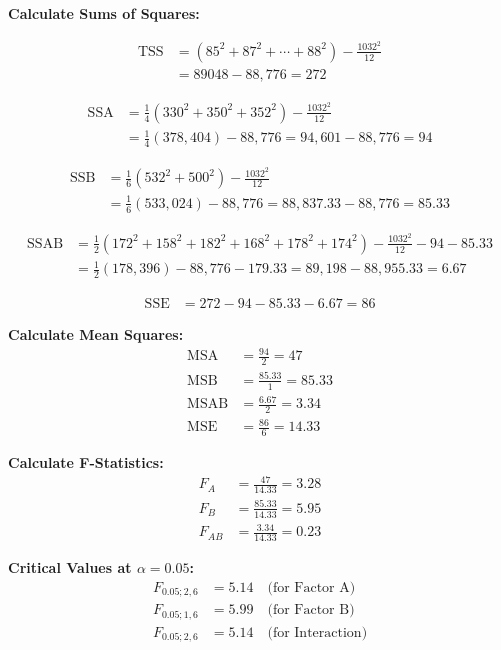 \documentclass[twoside]{book}
\begin{document}
\textbf{Calculate Sums of Squares:}

\begin{align*}
\text{TSS} &= (85^2 + 87^2 + \cdots + 88^2) - \frac{1032^2}{12} \\
&= 89048 - 88,776 = 272
\end{align*}

\begin{align*}
\text{SSA} &= \frac{1}{4}(330^2 + 350^2 + 352^2) - \frac{1032^2}{12} \\
&= \frac{1}{4}(378,404) - 88,776 = 94,601 - 88,776 = 94
\end{align*}

\begin{align*}
\text{SSB} &= \frac{1}{6}(532^2 + 500^2) - \frac{1032^2}{12} \\
&= \frac{1}{6}(533,024) - 88,776 = 88,837.33 - 88,776 = 85.33
\end{align*}

\begin{align*}
\text{SSAB} &= \frac{1}{2}(172^2 + 158^2 + 182^2 + 168^2 + 178^2 + 174^2) - \frac{1032^2}{12} - 94 - 85.33 \\
&= \frac{1}{2}(178,396) - 88,776 - 179.33 = 89,198 - 88,955.33 = 6.67
\end{align*}

\begin{align*}
\text{SSE} &= 272 - 94 - 85.33 - 6.67 = 86
\end{align*}

\textbf{Calculate Mean Squares:}
\begin{align*}
\text{MSA} &= \frac{94}{2} = 47 \\
\text{MSB} &= \frac{85.33}{1} = 85.33 \\
\text{MSAB} &= \frac{6.67}{2} = 3.34 \\
\text{MSE} &= \frac{86}{6} = 14.33
\end{align*}

\textbf{Calculate F-Statistics:}
\begin{align*}
F_A &= \frac{47}{14.33} = 3.28 \\
F_B &= \frac{85.33}{14.33} = 5.95 \\
F_{AB} &= \frac{3.34}{14.33} = 0.23
\end{align*}

\textbf{Critical Values at $\alpha = 0.05$:}
\begin{align*}
F_{0.05; 2, 6} &= 5.14 \quad \text{(for Factor A)} \\
F_{0.05; 1, 6} &= 5.99 \quad \text{(for Factor B)} \\
F_{0.05; 2, 6} &= 5.14 \quad \text{(for Interaction)}
\end{align*}
\end{document}
